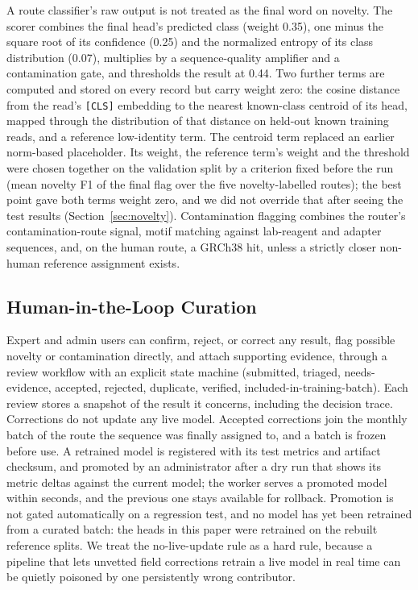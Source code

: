 \documentclass[conference]{IEEEtran}
\begin{document}
A route classifier's raw output is not treated as the final word on novelty. The scorer combines the final head's predicted class (weight 0.35), one minus the square root of its confidence (0.25) and the normalized entropy of its class distribution (0.07), multiplies by a sequence-quality amplifier and a contamination gate, and thresholds the result at 0.44. Two further terms are computed and stored on every record but carry weight zero: the cosine distance from the read's \texttt{[CLS]} embedding to the nearest known-class centroid of its head, mapped through the distribution of that distance on held-out known training reads, and a reference low-identity term. The centroid term replaced an earlier norm-based placeholder. Its weight, the reference term's weight and the threshold were chosen together on the validation split by a criterion fixed before the run (mean novelty F1 of the final flag over the five novelty-labelled routes); the best point gave both terms weight zero, and we did not override that after seeing the test results (Section~\ref{sec:novelty}). Contamination flagging combines the router's contamination-route signal, motif matching against lab-reagent and adapter sequences, and, on the human route, a GRCh38 hit, unless a strictly closer non-human reference assignment exists.

\subsection{Human-in-the-Loop Curation}

Expert and admin users can confirm, reject, or correct any result, flag possible novelty or contamination directly, and attach supporting evidence, through a review workflow with an explicit state machine (submitted, triaged, needs-evidence, accepted, rejected, duplicate, verified, included-in-training-batch). Each review stores a snapshot of the result it concerns, including the decision trace. Corrections do not update any live model. Accepted corrections join the monthly batch of the route the sequence was finally assigned to, and a batch is frozen before use. A retrained model is registered with its test metrics and artifact checksum, and promoted by an administrator after a dry run that shows its metric deltas against the current model; the worker serves a promoted model within seconds, and the previous one stays available for rollback. Promotion is not gated automatically on a regression test, and no model has yet been retrained from a curated batch: the heads in this paper were retrained on the rebuilt reference splits. We treat the no-live-update rule as a hard rule, because a pipeline that lets unvetted field corrections retrain a live model in real time can be quietly poisoned by one persistently wrong contributor.
\end{document}
